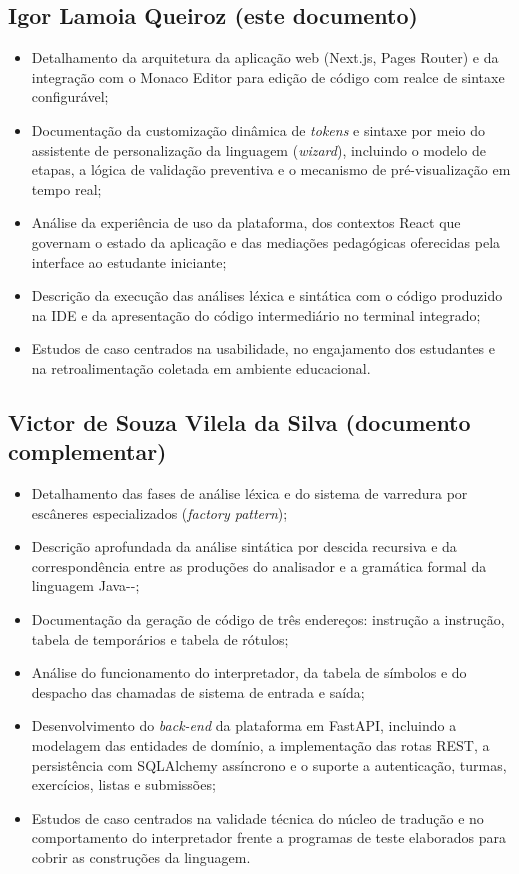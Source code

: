 \subsection{Igor Lamoia Queiroz (este documento)}

\begin{itemize}
    \item Detalhamento da arquitetura da aplicação web (Next.js, Pages Router) e da integração com o Monaco Editor para edição de código com realce de sintaxe configurável;
    \item Documentação da customização dinâmica de \textit{tokens} e sintaxe por meio do assistente de personalização da linguagem (\textit{wizard}), incluindo o modelo de etapas, a lógica de validação preventiva e o mecanismo de pré-visualização em tempo real;
    \item Análise da experiência de uso da plataforma, dos contextos React que governam o estado da aplicação e das mediações pedagógicas oferecidas pela interface ao estudante iniciante;
    \item Descrição da execução das análises léxica e sintática com o código produzido na IDE e da apresentação do código intermediário no terminal integrado;
    \item Estudos de caso centrados na usabilidade, no engajamento dos estudantes e na retroalimentação coletada em ambiente educacional.
\end{itemize}

\subsection{Victor de Souza Vilela da Silva (documento complementar)}

\begin{itemize}
    \item Detalhamento das fases de análise léxica e do sistema de varredura por escâneres especializados (\textit{factory pattern});
    \item Descrição aprofundada da análise sintática por descida recursiva e da correspondência entre as produções do analisador e a gramática formal da linguagem Java-{}-;
    \item Documentação da geração de código de três endereços: instrução a instrução, tabela de temporários e tabela de rótulos;
    \item Análise do funcionamento do interpretador, da tabela de símbolos e do despacho das chamadas de sistema de entrada e saída;
    \item Desenvolvimento do \textit{back-end} da plataforma em FastAPI, incluindo a modelagem das entidades de domínio, a implementação das rotas REST, a persistência com SQLAlchemy assíncrono e o suporte a autenticação, turmas, exercícios, listas e submissões;
    \item Estudos de caso centrados na validade técnica do núcleo de tradução e no comportamento do interpretador frente a programas de teste elaborados para cobrir as construções da linguagem.
\end{itemize}
